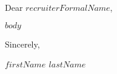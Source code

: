 \documentclass{cobaltCoverLetter}
\date{$date$}
\begin{document}
  \changefontsize[9pt]{9pt}
  \thispagestyle{cobaltHeader}
   \vspace*{2cm}

  \noindent Dear $recruiterFormalName$,
  \vspace*{0.75cm}

  $body$

  \noindent
  Sincerely,
  \vspace*{0.75cm}

  \noindent
  \textbf{$firstName$ $lastName$}
\end{document}
